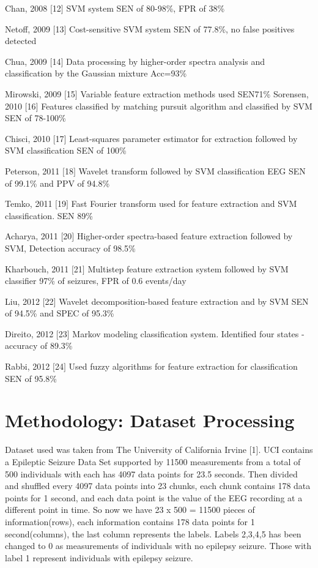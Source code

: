 \documentclass{llncs}       %
\begin{document}
Chan, 2008 $[$12$]$  SVM system SEN of 80-98\%, FPR of 38\% 

Netoff, 2009 $[$13$]$  Cost-sensitive SVM system SEN of 77.8\%, no false positives detected 

Chua, 2009 $[$14$]$  Data processing by higher-order spectra analysis and classification by the Gaussian mixture Acc=93\% 

Mirowski, 2009 $[$15$]$  Variable feature extraction methods used SEN71\% 
Sorensen, 2010 $[$16$]$  Features classified by matching pursuit algorithm and classified by SVM SEN of 78-100\% 

Chisci, 2010 $[$17$]$  Least-squares parameter estimator for extraction followed by SVM classification SEN of 100\% 

Peterson, 2011 $[$18$]$  Wavelet transform followed by SVM classification EEG SEN of 99.1\% and PPV of 94.8\% 

Temko, 2011 $[$19$]$  Fast Fourier transform used for feature extraction and SVM classification.  SEN 89\% 

Acharya, 2011 $[$20$]$  Higher-order spectra-based feature extraction followed by SVM, Detection accuracy of 98.5\% 

Kharbouch, 2011 $[$21$]$  Multistep feature extraction system followed by SVM classifier 97\% of seizures, FPR of 0.6 events/day 

Liu, 2012 $[$22$]$  Wavelet decomposition-based feature extraction  and by SVM  SEN of 94.5\% and SPEC of 95.3\% 

Direito, 2012 $[$23$]$  Markov modeling classification system. Identified four states - accuracy of 89.3\% 

Rabbi, 2012 $[$24$]$  Used fuzzy algorithms for feature extraction for classification SEN of 95.8\%


\paragraph{}
\section{Methodology: Dataset Processing}
\label{sec:2}

Dataset used was taken from The University of California Irvine [1].  UCI contains a Epileptic Seizure Data Set supported by 11500 measurements from a total of 500 individuals with each has 4097 data points for 23.5 seconds.   Then divided and shuffled every 4097 data points into 23 chunks, each chunk contains 178 data points for 1 second, and each data point is the value of the EEG recording at a different point in time. So now we have 23 x 500 = 11500 pieces of information(rows), each information contains 178 data points for 1 second(columns), the last column represents the labels.  Labels {2,3,4,5} has been changed to {0} as measurements of individuals with no epilepsy seizure.  Those with label {1} represent individuals with epilepsy seizure.   
\end{document}
